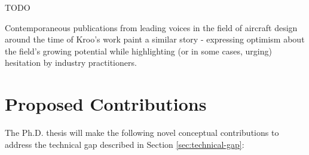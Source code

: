 \documentclass[12pt,vi,oneside]{report}
\begin{document}
    \cite{salas_framework_1998} %

    TODO






    Contemporaneous publications from leading voices in the field of aircraft design around the time of Kroo's work paint a similar story - expressing optimism about the field's growing potential while highlighting (or in some cases, urging) hesitation by industry practitioners.



    \section{Proposed Contributions}
    \label{sec:contributions}

    The Ph.D. thesis will make the following novel conceptual contributions to address the technical gap described in Section \ref{sec:technical-gap}:


\end{document}
